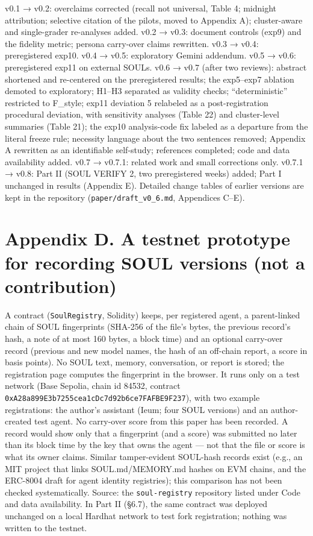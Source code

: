 \documentclass[10pt]{article}
\begin{document}
v0.1 → v0.2: overclaims corrected (recall not universal, Table 4; midnight attribution; selective citation of the pilots, moved to Appendix A); cluster-aware and single-grader re-analyses added. v0.2 → v0.3: document controls (exp9) and the fidelity metric; persona carry-over claims rewritten. v0.3 → v0.4: preregistered exp10. v0.4 → v0.5: exploratory Gemini addendum. v0.5 → v0.6: preregistered exp11 on external SOULs. v0.6 → v0.7 (after two reviews): abstract shortened and re-centered on the preregistered results; the exp5--exp7 ablation demoted to exploratory; H1--H3 separated as validity checks; ``deterministic'' restricted to F\_style; exp11 deviation 5 relabeled as a post-registration procedural deviation, with sensitivity analyses (Table 22) and cluster-level summaries (Table 21); the exp10 analysis-code fix labeled as a departure from the literal freeze rule; necessity language about the two sentences removed; Appendix A rewritten as an identifiable self-study; references completed; code and data availability added. v0.7 → v0.7.1: related work and small corrections only. v0.7.1 → v0.8: Part II (SOUL VERIFY 2, two preregistered weeks) added; Part I unchanged in results (Appendix E). Detailed change tables of earlier versions are kept in the repository (\texttt{paper/\allowbreak{}draft\_\allowbreak{}v0\_\allowbreak{}6.\allowbreak{}md}, Appendices C--E).

\section{Appendix D. A testnet prototype for recording SOUL versions (not a contribution)}\label{appendix-d.-a-testnet-prototype-for-recording-soul-versions-not-a-contribution}

A contract (\texttt{SoulRegistry}, Solidity) keeps, per registered agent, a parent-linked chain of SOUL fingerprints (SHA-256 of the file's bytes, the previous record's hash, a note of at most 160 bytes, a block time) and an optional carry-over record (previous and new model names, the hash of an off-chain report, a score in basis points). No SOUL text, memory, conversation, or report is stored; the registration page computes the fingerprint in the browser. It runs only on a test network (Base Sepolia, chain id 84532, contract \texttt{0xA28a899E3b7255cea1cDc7d92b6ce7FAFBE9F237}), with two example registrations: the author's assistant (Ieum; four SOUL versions) and an author-created test agent. No carry-over score from this paper has been recorded. A record would show only that a fingerprint (and a score) was submitted no later than its block time by the key that owns the agent --- not that the file or score is what its owner claims. Similar tamper-evident SOUL-hash records exist (e.g., an MIT project that links SOUL.md/MEMORY.md hashes on EVM chains, and the ERC-8004 draft for agent identity registries); this comparison has not been checked systematically. Source: the \texttt{soul-\allowbreak{}registry} repository listed under Code and data availability. In Part II (§6.7), the same contract was deployed unchanged on a local Hardhat network to test fork registration; nothing was written to the testnet.
\end{document}
